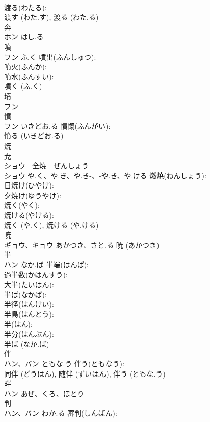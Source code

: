 \documentclass[8pt]{extreport}
\begin{document}
\begin{CJK}{UTF8}{min}
\\	渡る(わたる): 
\\	渡す (わた.す), 渡る (わた.る)
\\	奔			
\\	ホン	はし.る		
\\	噴			
\\	フン	ふ.く	噴出(ふんしゅつ): 
\\	噴火(ふんか): 
\\	噴水(ふんすい): 
\\	噴く (ふ.く)
\\	墳			
\\	フン			
\\	憤			
\\	フン	いきどお.る	憤慨(ふんがい): 
\\	憤る (いきどお.る)
\\	焼			
\\	尭 
\\	ショウ　全焼　ぜんしょう
\\	ショウ	や.く、や.き、や.き-、-や.き、や.ける	燃焼(ねんしょう): 
\\	日焼け(ひやけ): 
\\	夕焼け(ゆうやけ): 
\\	焼く(やく): 
\\	焼ける(やける): 
\\	焼く (や.く), 焼ける (や.ける)
\\	暁			
\\	ギョウ、キョウ	あかつき、さと.る		暁 (あかつき)
\\	半			
\\	ハン	なか.ば	半端(はんぱ): 
\\	過半数(かはんすう): 
\\	大半(たいはん): 
\\	半ば(なかば): 
\\	半径(はんけい): 
\\	半島(はんとう): 
\\	半(はん): 
\\	半分(はんぶん): 
\\	半ば (なか.ば)
\\	伴			
\\	ハン、バン	ともな.う	伴う(ともなう): 
\\	同伴 (どうはん), 随伴 (ずいはん), 伴う (ともな.う)
\\	畔			
\\	ハン	あぜ、くろ、ほとり		
\\	判			
\\	ハン、バン	わか.る	審判(しんばん): 

\end{CJK}
\end{document}
